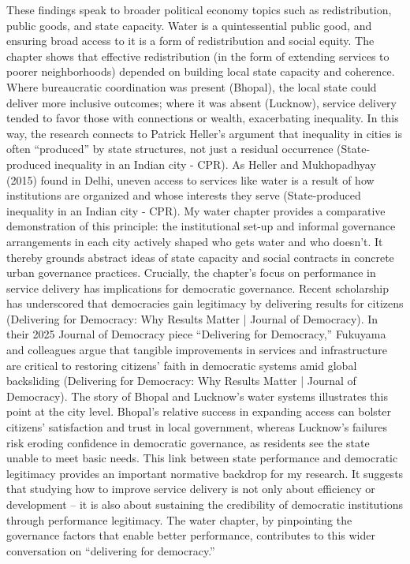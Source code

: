 These findings speak to broader political economy topics such as redistribution, public goods, and state capacity. Water is a quintessential public good, and ensuring broad access to it is a form of redistribution and social equity. The chapter shows that effective redistribution (in the form of extending services to poorer neighborhoods) depended on building local state capacity and coherence. Where bureaucratic coordination was present (Bhopal), the local state could deliver more inclusive outcomes; where it was absent (Lucknow), service delivery tended to favor those with connections or wealth, exacerbating inequality. In this way, the research connects to Patrick Heller’s argument that inequality in cities is often “produced” by state structures, not just a residual occurrence (State-produced inequality in an Indian city - CPR). As Heller and Mukhopadhyay (2015) found in Delhi, uneven access to services like water is a result of how institutions are organized and whose interests they serve (State-produced inequality in an Indian city - CPR). My water chapter provides a comparative demonstration of this principle: the institutional set-up and informal governance arrangements in each city actively shaped who gets water and who doesn’t. It thereby grounds abstract ideas of state capacity and social contracts in concrete urban governance practices.
Crucially, the chapter’s focus on performance in service delivery has implications for democratic governance. Recent scholarship has underscored that democracies gain legitimacy by delivering results for citizens (Delivering for Democracy: Why Results Matter | Journal of Democracy). In their 2025 Journal of Democracy piece “Delivering for Democracy,” Fukuyama and colleagues argue that tangible improvements in services and infrastructure are critical to restoring citizens’ faith in democratic systems amid global backsliding (Delivering for Democracy: Why Results Matter | Journal of Democracy). The story of Bhopal and Lucknow’s water systems illustrates this point at the city level. Bhopal’s relative success in expanding access can bolster citizens’ satisfaction and trust in local government, whereas Lucknow’s failures risk eroding confidence in democratic governance, as residents see the state unable to meet basic needs. This link between state performance and democratic legitimacy provides an important normative backdrop for my research. It suggests that studying how to improve service delivery is not only about efficiency or development – it is also about sustaining the credibility of democratic institutions through performance legitimacy. The water chapter, by pinpointing the governance factors that enable better performance, contributes to this wider conversation on “delivering for democracy.”
